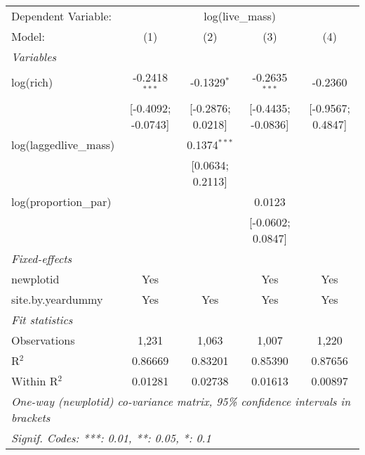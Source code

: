 \begin{tabular}{lcccc}
\tabularnewline\midrule\midrule
Dependent Variable:&\multicolumn{4}{c}{log(live\_mass)}\\
Model:&(1) & (2) & (3) & (4)\\
\midrule \emph{Variables}&   &   &   &  \\
log(rich)&-0.2418$^{***}$ & -0.1329$^{*}$ & -0.2635$^{***}$ & -0.2360\\
  &[-0.4092; -0.0743] & [-0.2876; 0.0218] & [-0.4435; -0.0836] & [-0.9567; 0.4847]\\
log(laggedlive\_mass)&   & 0.1374$^{***}$ &    &   \\
  &   & [0.0634; 0.2113] &    &   \\
log(proportion\_par)&   &    & 0.0123 &   \\
  &   &    & [-0.0602; 0.0847] &   \\
\midrule \emph{Fixed-effects}&   &   &   &  \\
newplotid & Yes &  & Yes & Yes\\
site.by.yeardummy & Yes & Yes & Yes & Yes\\
\midrule \emph{Fit statistics}&  & & & \\
Observations & 1,231&1,063&1,007&1,220\\
R$^2$ & 0.86669&0.83201&0.85390&0.87656\\
Within R$^2$ & 0.01281&0.02738&0.01613&0.00897\\
\midrule\midrule\multicolumn{5}{l}{\emph{One-way (newplotid) co-variance matrix, 95\% confidence intervals in brackets}}\\
\multicolumn{5}{l}{\emph{Signif. Codes: ***: 0.01, **: 0.05, *: 0.1}}\\
\end{tabular}


